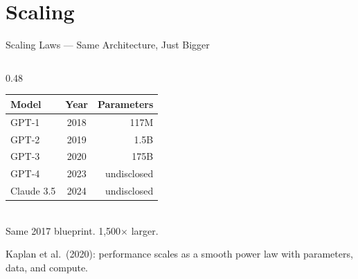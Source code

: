 \documentclass[aspectratio=169,12pt]{beamer}
\begin{document}
\section{Scaling}
\begin{frame}{Scaling Laws --- Same Architecture, Just Bigger}

  \begin{columns}[T]
    \begin{column}{0.48\textwidth}
      \begin{tcolorbox}[colback=accentOrange!5, colframe=accentOrange,
        fonttitle=\bfseries\small, title={The Scaling Explosion},
        rounded corners, boxrule=0.8pt, left=3pt, right=3pt, top=2pt, bottom=2pt]
        \scriptsize
        \begin{tabular}{@{}lcr@{}}
          \toprule
          \textbf{Model} & \textbf{Year} & \textbf{Parameters} \\
          \midrule
          GPT-1 & 2018 & 117M \\
          GPT-2 & 2019 & 1.5B \\
          GPT-3 & 2020 & 175B \\
          GPT-4 & 2023 & undisclosed \\
          Claude 3.5 & 2024 & undisclosed \\
          \bottomrule
        \end{tabular}\\[6pt]
        Same 2017 blueprint. 1,500$\times$ larger.
      \end{tcolorbox}

      \vspace{0.2em}
      {\scriptsize Kaplan et al.\ (2020): performance scales as a smooth power law
       with parameters, data, and compute.}
    \end{column}


\end{columns}
\end{frame}
\end{document}

